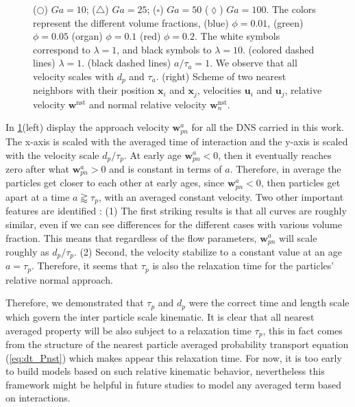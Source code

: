 \begin{figure}[h!]
{    ($\pmb\bigcirc$) $Ga=10$; ($\pmb\triangle$) $ Ga = 25$; ($\pmb\square$) $Ga = 50$ ($\pmb\lozenge$) $Ga =100$.
    The colors represent the different volume fractions, (blue) $\phi =0.01$, (green) $\phi = 0.05$ (organ) $\phi=0.1$ (red) $\phi = 0.2$. 
    The white symbols correspond to $\lambda = 1$, and black symbols to $\lambda = 10$. 
    (colored dashed lines) $\lambda = 1$. 
    (black dashed lines) $a/\tau_a =1$. 
    We observe that all velocity scales with $d_p$ and $\tau_a$. 
    (right)
    Scheme of two nearest neighbors with their position $\textbf{x}_i$ and $\textbf{x}_j$, velocities $\textbf{u}_{i}$ and $\textbf{u}_j$, relative velocity $\textbf{w}^\text{nst}$ and normal relative velocity $\textbf{w}^\text{nst}_n$. 
    }
    \label{fig:normal_vel_picture}
\end{figure}
In \ref{fig:normal_vel_picture}(left) display the approach velocity $\textbf{w}_{pn}^a$ for all the DNS carried in this work. 
The x-axis is scaled with the averaged time of interaction and the y-axis is scaled with the velocity scale $d_p /\tau_p$. 
At  early age $\textbf{w}_{pn}^a<0$, then it eventually reaches zero after what $\textbf{w}_{pn}^a>0$ and is constant in terms of $a$. 
Therefore, in average the particles get closer to each other at early ages, since $\textbf{w}_{pn}^a<0$, then particles get apart at a time $a \gtrapprox \tau_p$, with an averaged constant velocity. 
Two other important features are identified :
(1) The first striking results is that all curves  are roughly similar, even if we can see differences for the different cases with various volume fraction. 
This means that regardless of the flow parameters, $\textbf{w}_{pn}^a$ will scale roughly as $d_p /\tau_p$. 
(2) Second, the velocity stabilize to a constant value at an age $a = \tau_p$. 
Therefore, it seems that $\tau_p$ is also the relaxation time for the particles' relative normal approach. 

Therefore, we demonstrated that $\tau_p$ and $d_p$ were the correct time and length scale which govern the inter particle scale kinematic. 
It is clear that all nearest averaged property will be also subject to a relaxation time $\tau_p$, this in fact comes from the structure of the nearest particle averaged probability transport equation (\ref{eq:dt_Pnst}) which makes appear this relaxation time. 
For now, it is too early to build models based on such relative kinematic behavior, nevertheless this framework might be helpful in future studies to model any averaged term based on interactions. 


